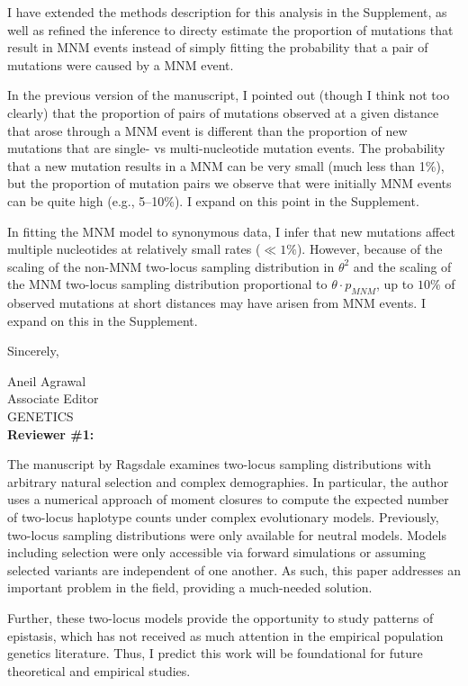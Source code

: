 \documentclass{article}
\newenvironment{response}%
  {\list{}{\leftmargin=0.5in\rightmargin=0.5in\color{blue}}\item[]}%
  {\endlist}
\begin{document}
\begin{response}
    I have extended the methods description for this analysis in the Supplement, as
    well as refined the inference to directy estimate the proportion of mutations
    that result in MNM events instead of simply fitting the probability that a pair
    of mutations were caused by a MNM event.
    
    In the previous version of the manuscript, I pointed out (though I think not too
    clearly) that the proportion of pairs of mutations observed at a given distance
    that arose through a MNM event is different than the proportion of new mutations
    that are single- vs multi-nucleotide mutation events. The probability that a new
    mutation results in a MNM can be very small (much less than 1\%), but the proportion
    of mutation pairs we observe that were initially MNM events can be quite high
    (e.g., 5--10\%). I expand on this point in the Supplement.

    In fitting the MNM model to synonymous data, I infer that new mutations affect
    multiple nucleotides at relatively small rates ($\ll 1\%$). However, because of
    the scaling of the non-MNM two-locus sampling distribution in $\theta^2$ and
    the scaling of the MNM two-locus sampling distribution proportional to
    $\theta \cdot p_{MNM}$, up to $10\%$ of observed mutations at short distances may
    have arisen from MNM events. I expand on this in the Supplement.
\end{response}

Sincerely,

Aneil Agrawal\\
Associate Editor\\
GENETICS\\

\textbf{Reviewer \#1:}

The manuscript by Ragsdale examines two-locus sampling distributions with
arbitrary natural selection and complex demographies. In particular, the author
uses a numerical approach of moment closures to compute the expected number of
two-locus haplotype counts under complex evolutionary models. Previously,
two-locus sampling distributions were only available for neutral models. Models
including selection were only accessible via forward simulations or assuming
selected variants are independent of one another. As such, this paper addresses
an important problem in the field, providing a much-needed solution.

Further, these two-locus models provide the opportunity to study patterns of
epistasis, which has not received as much attention in the empirical population
genetics literature. Thus, I predict this work will be foundational for future
theoretical and empirical studies.
\end{document}
